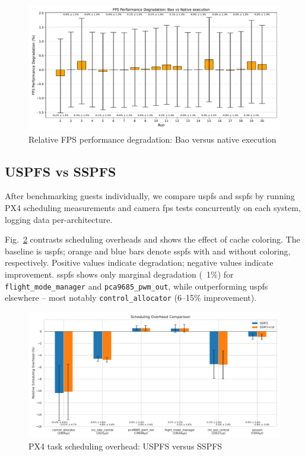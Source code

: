 \begin{figure}[!hbt]
  \centering
  \includegraphics[width=1.0\textwidth]{./img/pdf/fps-cmp} 
  \caption{Relative FPS performance degradation: Bao versus native execution}%
  \label{fig:fps-cmp}
\end{figure}

\subsection{USPFS vs SSPFS}
\label{sec:uspfs-vs-sspfs}
After benchmarking guests individually, we compare \gls{uspfs} and \gls{sspfs} by running PX4 scheduling measurements and camera \gls{fps} tests concurrently on each system, logging data per-architecture.

Fig.~\ref{fig:px4-sspfs-uspfs} contrasts scheduling overheads and shows the
effect of cache coloring. The baseline is \gls{uspfs}; orange and blue bars
denote \gls{sspfs} with and without coloring, respectively. Positive values
indicate degradation; negative values indicate improvement. \gls{sspfs} shows
only marginal degradation (~1\%) for \lstinline{flight_mode_manager} and
\lstinline{pca9685_pwm_out}, while outperforming \gls{uspfs} elsewhere -- most
notably \lstinline{control_allocator} (6–15\% improvement).

\begin{figure}[!hbt]
  \centering
  \includegraphics[width=1.0\textwidth]{./img/pdf/px4-sspfs-uspfs} 
  \caption{PX4 task scheduling overhead: USPFS versus SSPFS}%
  \label{fig:px4-sspfs-uspfs}
\end{figure}

